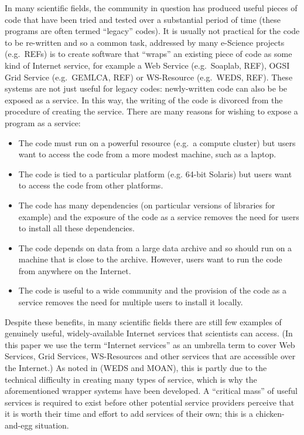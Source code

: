 \documentclass{llncs}
\begin{document}
In many scientific fields, the community in question has produced useful pieces of code that have been tried and tested over a substantial period of time (these programs are often termed ``legacy'' codes).  It is usually not practical for the code to be re-written and so a common task, addressed by many e-Science projects (e.g.\ REFs) is to create software that ``wraps'' an existing piece of code as some kind of Internet service, for example a Web Service (e.g.\ Soaplab, REF), OGSI Grid Service (e.g.\ GEMLCA, REF) or WS-Resource (e.g.\ WEDS, REF).  These systems are not just useful for legacy codes: newly-written code can also be be exposed as a service.  In this way, the writing of the code is divorced from the procedure of creating the service.  There are many reasons for wishing to expose a program as a service:
\begin{itemize}
	\item The code must run on a powerful resource (e.g.\ a compute cluster) but users want to access the code from a more modest machine, such as a laptop.
	\item The code is tied to a particular platform (e.g. 64-bit Solaris) but users want to access the code from other platforms.
	\item The code has many dependencies (on particular versions of libraries for example) and the exposure of the code as a service removes the need for users to install all these dependencies.
	\item The code depends on data from a large data archive and so should run on a machine that is close to the archive.  However, users want to run the code from anywhere on the Internet.
	\item The code is useful to a wide community and the provision of the code as a service removes the need for multiple users to install it locally.
\end{itemize}

Despite these benefits, in many scientific fields there are still few examples of genuinely useful, widely-available Internet services that scientists can access.  (In this paper we use the term ``Internet services'' as an umbrella term to cover Web Services, Grid Services, WS-Resources and other services that are accessible over the Internet.)  As noted in (WEDS and MOAN), this is partly due to the technical difficulty in creating many types of service, which is why the aforementioned wrapper systems have been developed.  A ``critical mass'' of useful services is required to exist before other potential service providers perceive that it is worth their time and effort to add services of their own; this is a chicken-and-egg situation.
\end{document}
